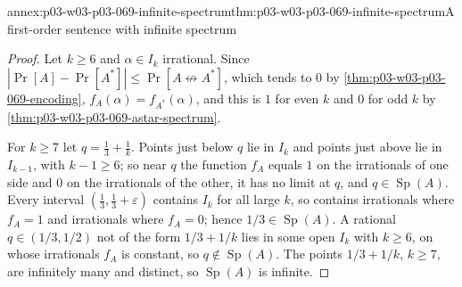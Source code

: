 \begin{annexitem}{annex:p03-w03-p03-069-infinite-spectrum}{thm:p03-w03-p03-069-infinite-spectrum}{A first-order sentence with infinite spectrum}
\begin{proof}
Let \(k\geq6\) and \(\alpha\in I_k\) irrational.  Since
\(|\Pr[A]-\Pr[A^*]|\leq\Pr[A\not\leftrightarrow A^*]\), which tends to \(0\)
by \cref{thm:p03-w03-p03-069-encoding}, \(f_A(\alpha)=f_{A^*}(\alpha)\), and
this is \(1\) for even \(k\) and \(0\) for odd \(k\) by
\cref{thm:p03-w03-p03-069-astar-spectrum}.

For \(k\geq7\) let \(q=\tfrac13+\tfrac1k\).  Points just below \(q\) lie in
\(I_k\) and points just above lie in \(I_{k-1}\), with \(k-1\geq6\); so near
\(q\) the function \(f_A\) equals \(1\) on the irrationals of one side and
\(0\) on the irrationals of the other, it has no limit at \(q\), and
\(q\in\operatorname{Sp}(A)\).  Every interval \((\tfrac13,\tfrac13+\varepsilon)\)
contains \(I_k\) for all large \(k\), so contains irrationals where
\(f_A=1\) and irrationals where \(f_A=0\); hence \(1/3\in\operatorname{Sp}(A)\).
A rational \(q\in(1/3,1/2)\) not of the form \(1/3+1/k\) lies in some open
\(I_k\) with \(k\geq6\), on whose irrationals \(f_A\) is constant, so
\(q\notin\operatorname{Sp}(A)\).  The points \(1/3+1/k\), \(k\geq7\), are
infinitely many and distinct, so \(\operatorname{Sp}(A)\) is infinite.
\end{proof}
\end{annexitem}

